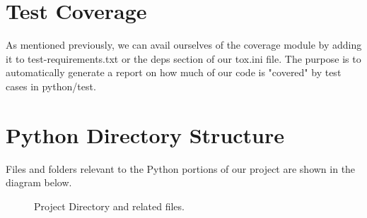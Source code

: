 \section{Test Coverage}

\justify
As mentioned previously, we can avail ourselves of the coverage module by adding it to test-requirements.txt or the deps section of our tox.ini file. The purpose is to automatically generate a report on how much of
our code is "covered" by test cases in python/test.

\section{Python Directory Structure}

Files and folders relevant to the Python portions of our project are shown in the diagram below.

\begin{figure}[!htb]
  \centering
  
  \caption{Project Directory and related files.}
\end{figure}


